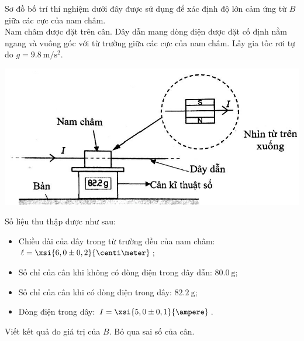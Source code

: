 \begin{ex}
Sơ đồ bố trí thí nghiệm dưới đây được sử dụng để xác định độ lớn cảm ứng từ $B$ giữa các cực của nam châm.\\
Nam châm được đặt trên cân. Dây dẫn mang dòng điện được đặt cố định nằm ngang và vuông góc với từ trường giữa các cực của nam châm. Lấy gia tốc rơi tự do $g=\SI{9.8}{\meter/\second^2}$.
\begin{center}
	\includegraphics[width=0.6\linewidth]{../figs/VN12-Y24-PH-SYL-018P-9}
\end{center}
	Số liệu thu thập được như sau:
	\begin{itemize}
		\item Chiều dài của dây trong từ trường đều của nam châm: $\ell=\xsi{6,0\pm 0,2}{\centi\meter}$;
		\item Số chỉ của cân khi không có dòng điện trong dây dẫn: $\SI{80,0}{\gram}$;
		\item Số chỉ của cân khi có dòng điện trong dây: $\SI{82.2}{\gram}$;
		\item Dòng điện trong dây: $I=\xsi{5,0\pm0,1}{\ampere}$.
	\end{itemize}
	Viết kết quả đo giá trị của $B$. Bỏ qua sai số của cân.
\end{ex}


